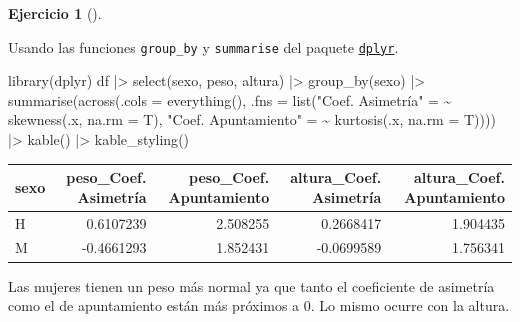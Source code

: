 \documentclass[
  a4paper,
]{scrreport}
\newenvironment{Shaded}{\begin{snugshade}}{\end{snugshade}}
\newcommand{\AttributeTok}[1]{\textcolor[rgb]{0.40,0.45,0.13}{#1}}
\newcommand{\ErrorTok}[1]{\textcolor[rgb]{0.68,0.00,0.00}{#1}}
\newcommand{\FunctionTok}[1]{\textcolor[rgb]{0.28,0.35,0.67}{#1}}
\newcommand{\NormalTok}[1]{\textcolor[rgb]{0.00,0.23,0.31}{#1}}
\newcommand{\OtherTok}[1]{\textcolor[rgb]{0.00,0.23,0.31}{#1}}
\newcommand{\SpecialCharTok}[1]{\textcolor[rgb]{0.37,0.37,0.37}{#1}}
\newcommand{\StringTok}[1]{\textcolor[rgb]{0.13,0.47,0.30}{#1}}
\theoremstyle{definition}
\newtheorem{exercise}{Ejercicio}[chapter]
\theoremstyle{remark}
\begin{document}
\begin{exercise}[]
\begin{enumerate}
\begin{tcolorbox}
  \end{tcolorbox}

  \begin{tcolorbox}[enhanced jigsaw, coltitle=black, left=2mm, colback=white, leftrule=.75mm, toptitle=1mm, breakable, bottomrule=.15mm, titlerule=0mm, bottomtitle=1mm, title=\textcolor{quarto-callout-tip-color}{\faLightbulb}\hspace{0.5em}{Solución 2}, arc=.35mm, toprule=.15mm, rightrule=.15mm, colframe=quarto-callout-tip-color-frame, opacityback=0, colbacktitle=quarto-callout-tip-color!10!white, opacitybacktitle=0.6]

  Usando las funciones \texttt{group\_by} y \texttt{summarise} del
  paquete \href{}{\texttt{dplyr}}.

\begin{Shaded}
\begin{Highlighting}[]
\FunctionTok{library}\NormalTok{(dplyr)}
\NormalTok{df }\SpecialCharTok{|\textgreater{}} \FunctionTok{select}\NormalTok{(sexo, peso, altura) }\SpecialCharTok{|\textgreater{}}
\FunctionTok{group\_by}\NormalTok{(sexo) }\SpecialCharTok{|\textgreater{}}
\FunctionTok{summarise}\NormalTok{(}\FunctionTok{across}\NormalTok{(}\AttributeTok{.cols =} \FunctionTok{everything}\NormalTok{(), }\AttributeTok{.fns =} \FunctionTok{list}\NormalTok{(}\StringTok{"Coef. Asimetría"} \OtherTok{=} \ErrorTok{\textasciitilde{}} \FunctionTok{skewness}\NormalTok{(.x, }\AttributeTok{na.rm =}\NormalTok{ T), }\StringTok{"Coef. Apuntamiento"} \OtherTok{=} \ErrorTok{\textasciitilde{}} \FunctionTok{kurtosis}\NormalTok{(.x, }\AttributeTok{na.rm =}\NormalTok{ T)))) }\SpecialCharTok{|\textgreater{}}
\FunctionTok{kable}\NormalTok{() }\SpecialCharTok{|\textgreater{}}
\FunctionTok{kable\_styling}\NormalTok{()}
\end{Highlighting}
\end{Shaded}

  \begin{table}
  \centering
  \begin{tabular}{l|r|r|r|r}
  \hline
  sexo & peso\_Coef. Asimetría & peso\_Coef. Apuntamiento & altura\_Coef. Asimetría & altura\_Coef. Apuntamiento\\
  \hline
  H & 0.6107239 & 2.508255 & 0.2668417 & 1.904435\\
  \hline
  M & -0.4661293 & 1.852431 & -0.0699589 & 1.756341\\
  \hline
  \end{tabular}
  \end{table}

  Las mujeres tienen un peso más normal ya que tanto el coeficiente de
  asimetría como el de apuntamiento están más próximos a 0. Lo mismo
  ocurre con la altura.

  \end{tcolorbox}
\end{enumerate}

\end{exercise}
\end{document}
